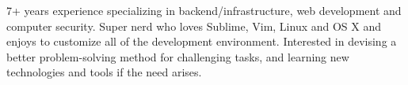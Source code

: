 

\begin{cvparagraph}

7+ years experience specializing in backend/infrastructure,
web development and computer security. Super nerd who loves Sublime, Vim,
Linux and OS X and enjoys to customize all of the development environment.
Interested in devising a better problem-solving method for challenging tasks,
and learning new technologies and tools if the need arises.
\end{cvparagraph}


